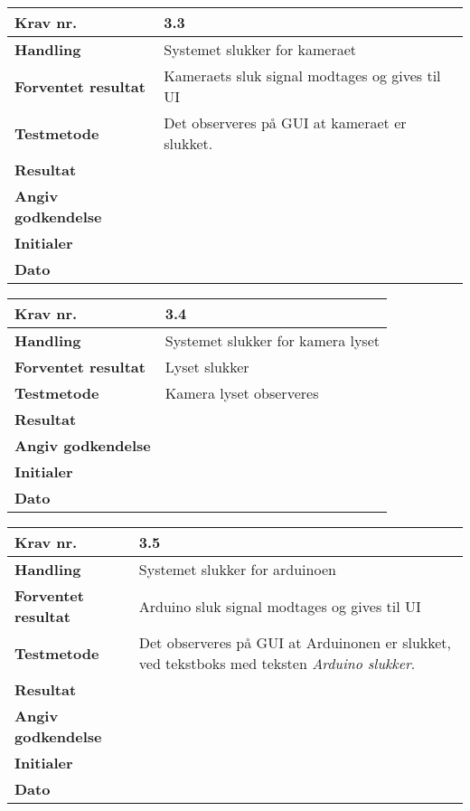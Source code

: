 	\begin{center}
		\begin{longtable}{ | m{4cm}| m{8.5cm}|} 
			\hline
			\textbf{Krav nr.} & 3.3  \\ 
			\hline
			\textbf{Handling} & Systemet slukker for kameraet  \\
			\hline
			\textbf{Forventet resultat} & Kameraets sluk signal modtages og gives til UI \\
			\hline
			\textbf{Testmetode}  & Det observeres på GUI at kameraet er slukket.  \\
			\hline
			\textbf{Resultat}  &    \\
			\hline
			\textbf{Angiv godkendelse} &     \\
			\hline
			\textbf{Initialer} &     \\
			\hline
			\textbf{Dato} &    \\
			\hline
		\end{longtable}
	\end{center}			
			
	\begin{center}
		\begin{longtable}{ | m{4cm}| m{8.5cm}|} 
			\hline
			\textbf{Krav nr.} & 3.4  \\ 
			\hline
			\textbf{Handling} & Systemet slukker for kamera lyset   \\
			\hline
			\textbf{Forventet resultat} & Lyset slukker \\
			\hline
			\textbf{Testmetode}  & Kamera lyset observeres  \\
			\hline
			\textbf{Resultat}  &    \\
			\hline
			\textbf{Angiv godkendelse} &     \\
			\hline
			\textbf{Initialer} &     \\
			\hline
			\textbf{Dato} &    \\
			\hline
		\end{longtable}
	\end{center}
			
	\begin{center}
		\begin{longtable}{ | m{4cm}| m{8.5cm}|} 
			\hline
			\textbf{Krav nr.} & 3.5  \\ 
			\hline
			\textbf{Handling} & Systemet slukker for arduinoen   \\
			\hline
			\textbf{Forventet resultat} & Arduino sluk signal modtages og gives til UI \\
			\hline
			\textbf{Testmetode}  & Det observeres på GUI at Arduinonen er slukket, ved tekstboks med teksten \textit{Arduino slukker}.  \\
			\hline
			\textbf{Resultat}  &    \\
			\hline
			\textbf{Angiv godkendelse} &     \\
			\hline
			\textbf{Initialer} &     \\
			\hline
			\textbf{Dato} &    \\
			\hline
		\end{longtable}
	\end{center}
					
